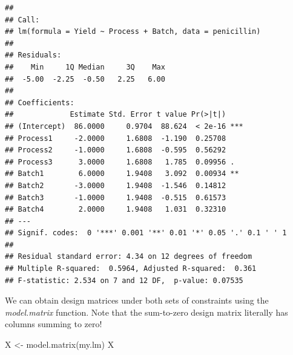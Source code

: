 \documentclass[
]{book}
\newenvironment{Shaded}{\begin{snugshade}}{\end{snugshade}}
\newcommand{\FunctionTok}[1]{\textcolor[rgb]{0.00,0.00,0.00}{#1}}
\newcommand{\NormalTok}[1]{#1}
\newcommand{\OtherTok}[1]{\textcolor[rgb]{0.56,0.35,0.01}{#1}}
\begin{document}
\begin{verbatim}
## 
## Call:
## lm(formula = Yield ~ Process + Batch, data = penicillin)
## 
## Residuals:
##    Min     1Q Median     3Q    Max 
##  -5.00  -2.25  -0.50   2.25   6.00 
## 
## Coefficients:
##             Estimate Std. Error t value Pr(>|t|)    
## (Intercept)  86.0000     0.9704  88.624  < 2e-16 ***
## Process1     -2.0000     1.6808  -1.190  0.25708    
## Process2     -1.0000     1.6808  -0.595  0.56292    
## Process3      3.0000     1.6808   1.785  0.09956 .  
## Batch1        6.0000     1.9408   3.092  0.00934 ** 
## Batch2       -3.0000     1.9408  -1.546  0.14812    
## Batch3       -1.0000     1.9408  -0.515  0.61573    
## Batch4        2.0000     1.9408   1.031  0.32310    
## ---
## Signif. codes:  0 '***' 0.001 '**' 0.01 '*' 0.05 '.' 0.1 ' ' 1
## 
## Residual standard error: 4.34 on 12 degrees of freedom
## Multiple R-squared:  0.5964, Adjusted R-squared:  0.361 
## F-statistic: 2.534 on 7 and 12 DF,  p-value: 0.07535
\end{verbatim}

We can obtain design matrices under both sets of constraints using the \emph{model.matrix} function. Note that the sum-to-zero design matrix literally has columns summing to zero!

\begin{Shaded}
\begin{Highlighting}[]
\NormalTok{X }\OtherTok{\textless{}{-}} \FunctionTok{model.matrix}\NormalTok{(my.lm)}
\NormalTok{X}
\end{Highlighting}
\end{Shaded}
\end{document}
